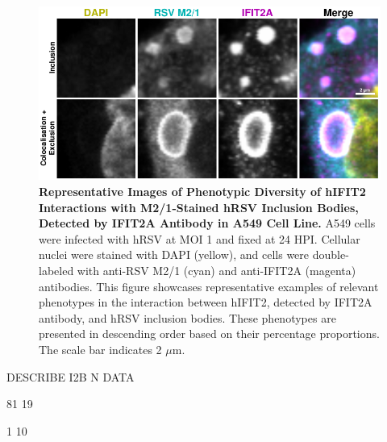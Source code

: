 \begin{figure}
    \centering
    \includegraphics[width=1\linewidth]{08. Chapter 3/Figs/02. Infection/02. IFIT2/01. IFIT2A/09. i2a a549 hrsv m21.pdf} 
    \caption[Representative Images of Phenotypic Diversity of hIFIT2 Interactions with M2/1-Stained hRSV Inclusion Bodies, Detected by IFIT2A Antibody in A549 Cell Line.]{\textbf{Representative Images of Phenotypic Diversity of hIFIT2 Interactions with M2/1-Stained hRSV Inclusion Bodies, Detected by IFIT2A Antibody in A549 Cell Line.} A549 cells were infected with hRSV at MOI 1 and fixed at 24 HPI. Cellular nuclei were stained with DAPI (yellow), and cells were double-labeled with anti-RSV M2/1 (cyan) and anti-IFIT2A (magenta) antibodies. This figure showcases representative examples of relevant phenotypes in the interaction between hIFIT2, detected by IFIT2A antibody, and hRSV inclusion bodies. These phenotypes are presented in descending order based on their percentage proportions. The scale bar indicates 2 \(\mu \mbox{m}\).}
    \label{fig:Representative Images of Phenotypic Diversity of hIFIT2 Interactions with M2/1-Stained hRSV Inclusion Bodies, Detected by IFIT2A Antibody in A549 Cell Line}
\end{figure}

DESCRIBE I2B N DATA

81 19

1 10

